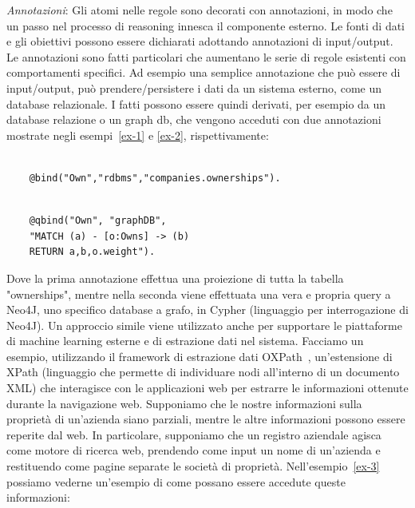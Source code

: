 \emph{Annotazioni}: Gli atomi nelle regole sono decorati con annotazioni, in modo che un passo nel processo di reasoning innesca il componente esterno. Le fonti di dati e gli obiettivi possono essere dichiarati adottando annotazioni di input/output. Le annotazioni sono fatti particolari che aumentano le serie di regole esistenti con comportamenti specifici. Ad esempio una semplice annotazione che può essere di input/output, può prendere/persistere i dati da un sistema esterno, come un database relazionale. I fatti possono essere quindi derivati, per esempio da un database relazione o un graph db, che vengono acceduti con due annotazioni mostrate negli esempi~\ref{ex-1} e \ref{ex-2}, rispettivamente:
\begin{example}\label{ex-1}
\normalfont
\begin{lstlisting}

	@bind("Own","rdbms","companies.ownerships").
\end{lstlisting}
\end{example}
\begin{example}\label{ex-2}
\normalfont
\begin{lstlisting}

	@qbind("Own", "graphDB", 
	"MATCH (a) - [o:Owns] -> (b) 
	RETURN a,b,o.weight"). 
\end{lstlisting}
\end{example}
Dove la prima annotazione effettua una proiezione di tutta la tabella "ownerships", mentre nella seconda viene effettuata una vera e propria query a Neo4J, uno specifico database a grafo, in Cypher (linguaggio per interrogazione di Neo4J). \newline
Un approccio simile viene utilizzato anche per supportare le piattaforme di machine learning esterne e di estrazione dati nel sistema. Facciamo un esempio, utilizzando il framework di estrazione dati OXPath~\cite{furche2013oxpath}, un'estensione di XPath (linguaggio che permette di individuare nodi all'interno di un documento XML) che interagisce con le applicazioni web per estrarre le informazioni ottenute durante la navigazione web. \newline
Supponiamo che le nostre informazioni sulla proprietà di un'azienda siano parziali, mentre le altre informazioni possono essere reperite dal web. In particolare, supponiamo che un registro aziendale agisca come motore di ricerca web, prendendo come input un nome di un'azienda e restituendo come pagine separate le società di proprietà. Nell'esempio~\ref{ex-3} possiamo vederne un'esempio di come possano essere accedute queste informazioni:
